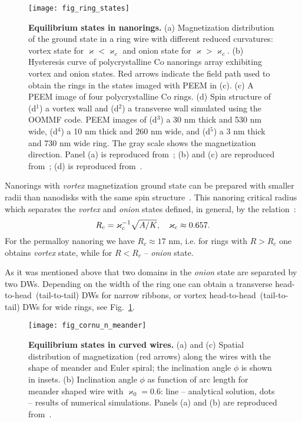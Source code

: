 \begin{figure}[t]
	\texttt{[image: fig\_ring\_states]}
	\caption{\label{fig:ring_states}%
		\textbf{Equilibrium states in nanorings.} (a) Magnetization distribution of the ground state in a ring wire with different reduced curvatures: vortex state for $\varkappa<\varkappa_c$ and onion state for $\varkappa>\varkappa_c$. (b) Hysteresis curve of polycrystalline  Co nanorings array exhibiting vortex and onion states. Red arrows indicate the field path used to obtain the rings in the states imaged with PEEM in (c). (c) A PEEM image of	four polycrystalline Co rings. (d) Spin structure of (d$^1$) a vortex wall and (d$^2$) a transverse wall simulated using the OOMMF code. PEEM images of (d$^3$) a 30 nm thick and 530 nm wide, (d$^4$) a 10 nm thick and 260 nm wide, and	(d$^5$) a 3 nm thick and 730 nm wide ring. The gray scale shows	the magnetization direction. Panel (a) is reproduced from~\cite{Sheka15}; (b) and (c) are reproduced from~\cite{Klaui03a}; (d) is reproduced from~\cite{Laufenberg06}.}
\end{figure}

Nanorings with \textit{vortex} magnetization ground state can be prepared with smaller radii than nanodisks with the same spin structure~\cite{Kravchuk07}. This nanoring critical radius which separates the \textit{vortex} and \textit{onion} states defined, in general, by the relation~\cite{Sheka15}:
\begin{equation}\notag
R_{c} = \varkappa_c^{-1}\sqrt{A/K},\quad \varkappa_c \approx 0.657.
\end{equation}
For the permalloy nanoring we have $R_{c}\approx 17$ nm, i.e. for rings with $R>R_c$ one obtains \textit{vortex} state, while for $R<R_c$ -- \textit{onion} state.

As it was mentioned above that two domains in the \textit{onion} state are separated by two DWs. Depending on the width of the ring one can obtain a transverse head-to-head~(tail-to-tail) DWs for narrow ribbons, or vortex head-to-head~(tail-to-tail) DWs for wide rings, see Fig.~\ref{fig:ring_states}.

\begin{figure}[t]
	\texttt{[image: fig\_cornu\_n\_meander]}
	\caption{\label{fig:cornu_n_meander}%
		\textbf{Equilibrium states in curved wires.} (a) and (c) Spatial distribution of magnetization (red arrows) along the wires with the shape of meander and Euler spiral; the inclination angle $\phi$ is shown in insets. (b) Inclination angle $\phi$ as function of arc length for meander shaped wire with $\varkappa_0=0.6$: line -- analytical solution, dots -- results of numerical simulations. Panels (a) and (b) are reproduced from~\cite{Korniienko19b}.}
\end{figure}

